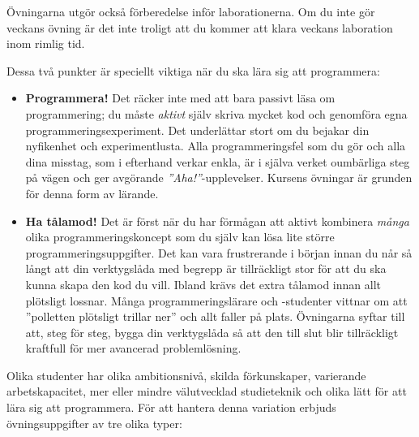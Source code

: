 Övningarna utgör också förberedelse inför laborationerna. Om du inte gör veckans övning är det inte troligt att du kommer att klara veckans laboration inom rimlig tid.

Dessa två punkter är speciellt viktiga när du ska lära sig att programmera:
\begin{itemize}
\item \textbf{Programmera!} Det räcker inte med att bara passivt läsa om programmering; du måste \emph{aktivt} själv skriva mycket kod och genomföra egna programmeringsexperiment. Det underlättar stort om du bejakar din nyfikenhet och experimentlusta. Alla programmeringsfel som du gör och alla dina misstag, som i efterhand verkar enkla, är i själva verket oumbärliga steg på vägen och ger avgörande \emph{''Aha!''}-upplevelser. Kursens övningar är grunden för denna form av lärande.

\item \textbf{Ha tålamod!} Det är först när du har förmågan att aktivt kombinera \emph{många} olika programmeringskoncept som du själv kan lösa lite större programmeringsuppgifter. Det kan vara frustrerande i början innan du når så långt att din verktygslåda med begrepp är tillräckligt stor för att du ska kunna skapa den kod du vill. Ibland krävs det extra tålamod innan allt plötsligt lossnar. Många programmeringslärare och -studenter vittnar om att ''polletten plötsligt trillar ner'' och allt faller på plats. Övningarna syftar till att, steg för steg, bygga din verktygslåda så att den till slut blir tillräckligt kraftfull för mer avancerad problemlösning.
\end{itemize}

Olika studenter har olika ambitionsnivå, skilda förkunskaper, varierande arbetskapacitet, mer eller mindre välutvecklad studieteknik och olika lätt för att lära sig att programmera. För att hantera denna variation erbjuds övningsuppgifter av tre olika typer:

